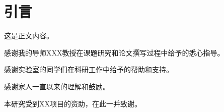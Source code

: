 \documentclass[degree=bachelor]{sduthesis}
\begin{document}
\MakeCover

\tableofcontents

\chapter{引言}
这是正文内容。

\begin{acknowledgement}
  感谢我的导师XXX教授在课题研究和论文撰写过程中给予的悉心指导。

  感谢实验室的同学们在科研工作中给予的帮助和支持。

  感谢家人一直以来的理解和鼓励。

  本研究受到XX项目的资助，在此一并致谢。
\end{acknowledgement}

\nocite{*}

\end{document}
